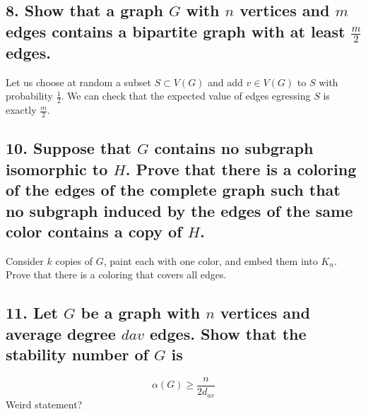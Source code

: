 \subsection[Random Walks - 8]{8. Show that a graph $G$ with $n$ vertices and $m$ edges contains a bipartite graph with at least $\frac{m}{2}$ edges.}

Let us choose at random a subset $S \subset V(G)$ and add $v \in V(G)$ to $S$ with probability $\frac{1}{2}$.
We can check that the expected value of edges egressing $S$ is exactly $\frac{m}{2}$.

\subsection[Random Walks - 10]{10. Suppose that $G$ contains no subgraph isomorphic to $H$. Prove that there is a coloring of the edges of the complete graph such that no subgraph induced by the edges of the same color contains a copy of $H$.}

Consider $k$ copies of $G$, paint each with one color, and embed them into $K_n$.
Prove that there is a coloring that covers all edges.

\subsection[Random Walks - 11]{11. Let $G$ be a graph with $n$ vertices and average degree $d{av}$ edges. Show that the stability number of $G$ is}
$$\alpha(G) \geq \frac{n}{2d_{av}}$$
Weird statement?
